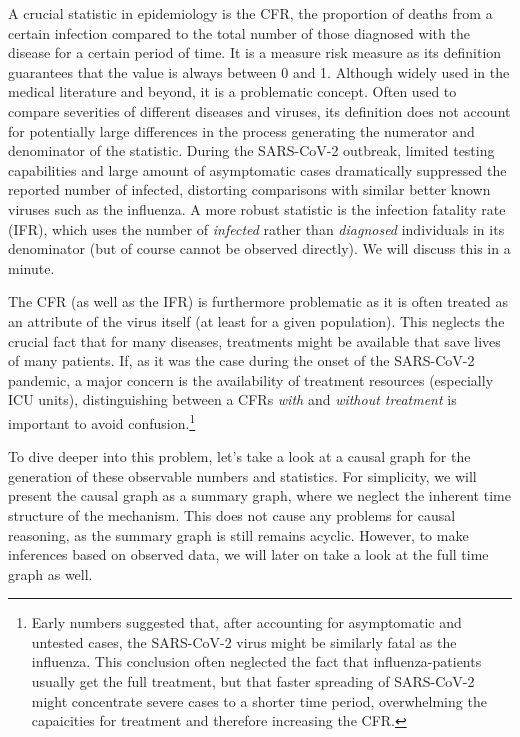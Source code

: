 \documentclass[
]{book}
\theoremstyle{definition}
\theoremstyle{definition}
\theoremstyle{definition}
\theoremstyle{remark}
\begin{document}
A crucial statistic in epidemiology is the CFR, the proportion of deaths from a certain infection compared to the total number of those diagnosed with the disease for a certain period of time. It is a measure risk measure as its definition guarantees that the value is always between 0 and 1. Although widely used in the medical literature and beyond, it is a problematic concept. Often used to compare severities of different diseases and viruses, its definition does not account for potentially large differences in the process generating the numerator and denominator of the statistic. During the SARS-CoV-2 outbreak, limited testing capabilities and large amount of asymptomatic cases dramatically suppressed the reported number of infected, distorting comparisons with similar better known viruses such as the influenza. A more robust statistic is the infection fatality rate (IFR), which uses the number of \emph{infected} rather than \emph{diagnosed} individuals in its denominator (but of course cannot be observed directly). We will discuss this in a minute.

The CFR (as well as the IFR) is furthermore problematic as it is often treated as an attribute of the virus itself (at least for a given population). This neglects the crucial fact that for many diseases, treatments might be available that save lives of many patients. If, as it was the case during the onset of the SARS-CoV-2 pandemic, a major concern is the availability of treatment resources (especially ICU units), distinguishing between a CFRs \emph{with} and \emph{without treatment} is important to avoid confusion.\footnote{Early numbers suggested that, after accounting for asymptomatic and untested cases, the SARS-CoV-2 virus might be similarly fatal as the influenza. This conclusion often neglected the fact that influenza-patients usually get the full treatment, but that faster spreading of SARS-CoV-2 might concentrate severe cases to a shorter time period, overwhelming the capaicities for treatment and therefore increasing the CFR.}

To dive deeper into this problem, let's take a look at a causal graph for the generation of these observable numbers and statistics. For simplicity, we will present the causal graph as a summary graph, where we neglect the inherent time structure of the mechanism. This does not cause any problems for causal reasoning, as the summary graph is still remains acyclic. However, to make inferences based on observed data, we will later on take a look at the full time graph as well.
\end{document}
